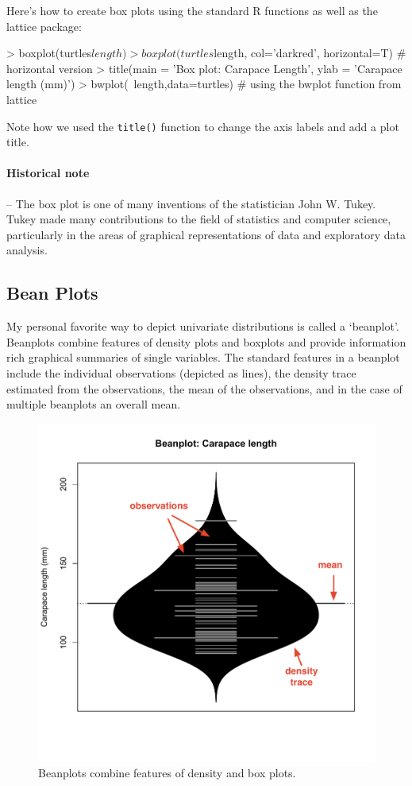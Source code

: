 Here's how to create box plots using the standard R functions as well as
the lattice package:

\begin{R}
> boxplot(turtles$length)
> boxplot(turtles$length, col='darkred', horizontal=T) # horizontal version
> title(main = 'Box plot: Carapace Length', ylab = 'Carapace length (mm)')
> bwplot(~length,data=turtles) # using the bwplot function from lattice
\end{R}
Note how we used the \lstinline!title()! function to change the axis
labels and add a plot title.

\paragraph{Historical note}

-- The box plot is one of many inventions of the statistician John W.
Tukey. Tukey made many contributions to the field of statistics and
computer science, particularly in the areas of graphical representations
of data and exploratory data analysis.

\subsection{Bean Plots}

My personal favorite way to depict univariate distributions is called a
`beanplot'. Beanplots combine features of density plots and boxplots and
provide information rich graphical summaries of single variables. The
standard features in a beanplot include the individual observations
(depicted as lines), the density trace estimated from the observations,
the mean of the observations, and in the case of multiple beanplots an
overall mean.

\begin{figure}[htbp]
\centering
\includegraphics[width=0.5\columnwidth]{./figures/hands-on2/beanplot-labeled.pdf}
\caption{Beanplots combine features of density and box plots.}
\end{figure}

